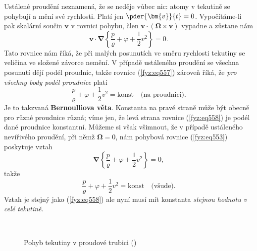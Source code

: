     Ustálené proudění neznamená, že se neděje vůbec nic: atomy v tekutině se pohybují a mění
    své rychlosti. Platí jen \(\pder{\bm{v}}{t} = 0\). Vypočítáme-li pak skalární součin \(\bm{v}\) 
    v rovnici pohybu, člen \(\bm{v}\cdot(\symbf{\Omega}\times\bm{v})\)  vypadne a zůstane nám
    \begin{equation}\label{fyz:eq557}
      \bm{v}\cdot\symbf{\nabla}\left\lbrace\dfrac{p}{\varrho}
      + \varphi + \dfrac{1}{2}v^2\right\rbrace = 0.
    \end{equation}
    Tato rovnice nám říká, že při malých posunutích ve směru rychlosti tekutiny se veličina ve 
    složené závorce nemění. V případě ustáleného proudění se všechna posunutí dějí podél proudnic, 
    takže rovnice (\ref{fyz:eq557}) zároveň říká, že \emph{pro všechny body podél proudnice} platí
    \begin{equation}\label{fyz:eq558}
      \dfrac{p}{\varrho}+\varphi+\dfrac{1}{2}v^2 = \text{konst} \quad \text{(na proudnici)}.
    \end{equation}
    Je to takzvaná \textbf{Bernoulliova věta}. Konstanta na pravé straně může být obecně pro různé 
    proudnice různá; víme jen, že levá strana rovnice (\ref{fyz:eq558}) je podél dané proudnice 
    konstantní. Můžeme si však všimnout, že v případě ustáleného nevířivého proudění, při němž 
    \(\symbf{\Omega} =0\), nám pohybová rovnice (\ref{fyz:eq553}) poskytuje vztah
    \begin{equation}\label{fyz:eq559}
      \symbf{\nabla}\left\lbrace\dfrac{p}{\varrho}+\varphi+\dfrac{1}{2}v^2\right\rbrace = 0,
    \end{equation}
    takže
    \begin{equation}\label{fyz:eq560}
      \dfrac{p}{\varrho}+\varphi+\dfrac{1}{2}v^2 = \text{konst} \quad \text{(všude)}.
    \end{equation}
    Vztah je stejný jako (\ref{fyz:eq558}) ale nyní musí mít konstanta \emph{stejnou hodnotu v celé 
    tekutině}.

    \begin{figure}[ht!]
      \centering
                     \\
      \caption{Pohyb tekutiny v proudové trubici
               (\cite[s.~748]{Feynman02})}
      \label{fyz:fig0549}
    \end{figure}
    
